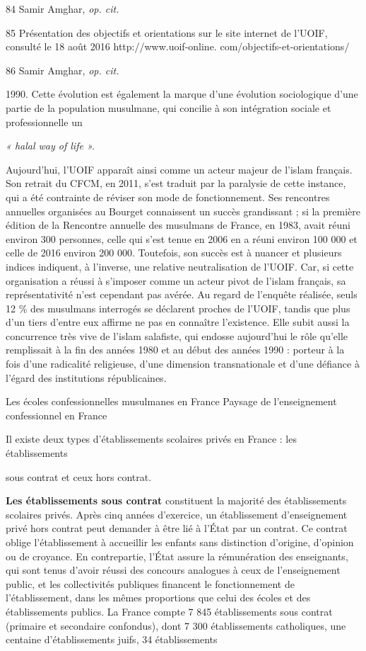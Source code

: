 84 Samir Amghar, \emph{op. cit.}

85 Présentation des objectifs et orientations sur le site internet de
l'UOIF, consulté le 18 août 2016 http://www.uoif-online.
com/objectifs-et-orientations/

86 Samir Amghar, \emph{op. cit.}



1990. Cette évolution est également la marque d'une évolution
sociologique d'une partie de la population musulmane, qui concilie à son
intégration sociale et professionnelle un

\emph{« halal way of life ».}

Aujourd'hui, l'UOIF apparaît ainsi comme un acteur majeur de l'islam
français. Son retrait du CFCM, en 2011, s'est traduit par la paralysie
de cette instance, qui a été contrainte de réviser son mode de
fonctionnement. Ses rencontres annuelles organisées au Bourget
connaissent un succès grandissant ; si la première édition de la
Rencontre annuelle des musulmans de France, en 1983, avait réuni environ
300 personnes, celle qui s'est tenue en 2006 en a réuni environ 100 000
et celle de 2016 environ 200 000. Toutefois, son succès est à nuancer et
plusieurs indices indiquent, à l'inverse, une relative neutralisation de
l'UOIF. Car, si cette organisation a réussi à s'imposer comme un acteur
pivot de l'islam français, sa représentativité n'est cependant pas
avérée. Au regard de l'enquête réalisée, seuls 12 \% des musulmans
interrogés se déclarent proches de l'UOIF, tandis que plus d'un tiers
d'entre eux affirme ne pas en connaître l'existence. Elle subit aussi la
concurrence très vive de l'islam salafiste, qui endosse aujourd'hui le
rôle qu'elle remplissait à la fin des années 1980 et au début des années
1990 : porteur à la fois d'une radicalité religieuse, d'une dimension
transnationale et d'une défiance à l'égard des institutions
républicaines.


Les écoles confessionnelles musulmanes en France Paysage de
l'enseignement confessionnel en France


Il existe deux types d'établissements scolaires privés en France : les
établissements

sous contrat et ceux hors contrat.

\textbf{Les établissements sous contrat} constituent la majorité des
établissements scolaires privés. Après cinq années d'exercice, un
établissement d'enseignement privé hors contrat peut demander à être lié
à l'État par un contrat. Ce contrat oblige l'établissement à accueillir
les enfants sans distinction d'origine, d'opinion ou de croyance. En
contrepartie, l'État assure la rémunération des enseignants, qui sont
tenus d'avoir réussi des concours analogues à ceux de l'enseignement
public, et les collectivités publiques financent le fonctionnement de
l'établissement, dans les mêmes proportions que celui des écoles et des
établissements publics. La France compte 7 845 établissements sous
contrat (primaire et secondaire confondus), dont 7 300 établissements
catholiques, une centaine d'établissements juifs, 34 établissements

